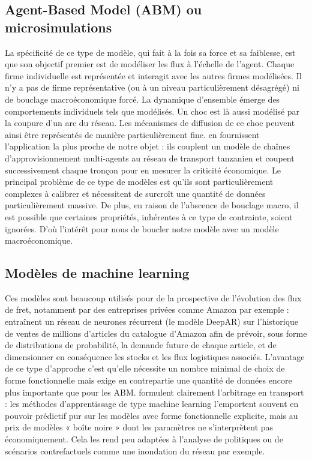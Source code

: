 \documentclass[12pt,a4paper,french]{report}
\begin{document}
	\subsection {Agent-Based Model (ABM) ou microsimulations}
	\label{subsec:ABM}
	
	La spécificité de ce type de modèle, qui fait à la fois sa force et sa faiblesse, est que son objectif premier est de modéliser les flux à l'échelle de l'agent. Chaque firme individuelle est représentée et interagit avec les autres firmes modélisées. Il n'y a pas de firme représentative (ou à un niveau particulièrement désagrégé) ni de bouclage macroéconomique forcé. La dynamique d'ensemble émerge des comportements individuels tels que modélisés. Un choc est là aussi modélisé par la coupure d'un arc du réseau. Les mécanismes de diffusion de ce choc peuvent ainsi être représentés de manière particulièrement fine. \cite{Colon2021} en fournissent l'application la plus proche de notre objet : ils couplent un modèle de chaînes d'approvisionnement multi-agents au réseau de transport tanzanien et coupent successivement chaque tronçon pour en mesurer la criticité économique. Le principal problème de ce type de modèles est qu'ils sont particulièrement complexes à calibrer et nécessitent de surcroît une quantité de données particulièrement massive. De plus, en raison de l'abscence de bouclage macro, il est possible que certaines propriétés, inhérentes à ce type de contrainte, soient ignorées. D'où l'intérêt pour nous de boucler notre modèle avec un modèle macroéconomique.
		
	\subsection {Modèles de machine learning}
	\label{subsec:machine_learning}
	
	Ces modèles sont beaucoup utilisés pour de la prospective de l'évolution des flux de fret, notamment par des entreprises privées comme Amazon par exemple : \cite{Salinas2020} entraînent un réseau de neurones récurrent (le modèle DeepAR) sur l'historique de ventes de millions d'articles du catalogue d'Amazon afin de prévoir, sous forme de distributions de probabilité, la demande future de chaque article, et de dimensionner en conséquence les stocks et les flux logistiques associés. L'avantage de ce type d'approche c'est qu'elle nécessite un nombre minimal de choix de forme fonctionnelle mais exige en contrepartie une quantité de données encore plus importante que pour les ABM. \cite{Karlaftis2011} formulent clairement l'arbitrage en transport : les méthodes d'apprentissage de type machine learning l'emportent souvent en pouvoir prédictif pur sur les modèles avec forme fonctionnelle explicite, mais au prix de modèles « boîte noire » dont les paramètres ne s'interprètent pas économiquement. Cela les rend peu adaptées à l'analyse de politiques ou de scénarios contrefactuels comme une inondation du réseau par exemple. 
	
\end{document}
